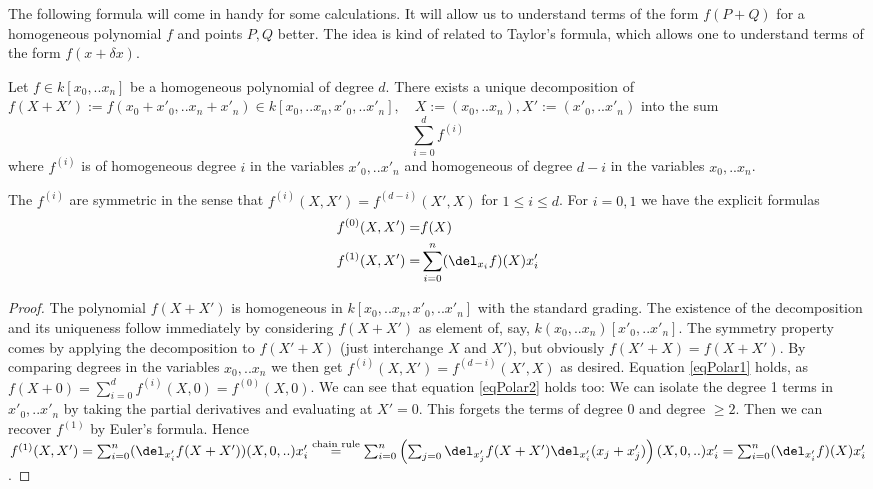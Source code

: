 The following formula will come in handy for some calculations.
It will allow us to understand terms of the form $f(P+Q)$ for a homogeneous polynomial $f$ and points $P,Q$ better.
The idea is kind of related to Taylor's formula, which allows one to understand terms of the form $f(x + \delta x)$.
\begin{proposition} \label{propositionTaylor}
Let $f \in k[x_0,..x_n]$ be a homogeneous polynomial of degree $d$.
There exists a unique decomposition of $f(X+X') := f(x_0+x'_0,..x_n+x'_n) \in k[x_0,..x_n,x'_0,..x'_n], \quad X := (x_0,..x_n), X' := (x'_0,..x'_n)$ into the sum
\begin{equation}
\sum_{i=0}^d f^{(i)}
\end{equation}
where $f^{(i)}$ is of homogeneous degree $i$ in the variables $x'_0,..x'_n$ and homogeneous of degree $d-i$ in the variables $x_0,..x_n$.

The $f^{(i)}$ are symmetric in the sense that $f^{(i)}(X,X') = f^{(d-i)}(X',X)$ for $1 \leq i \leq d$.
For $i = 0,1$ we have the explicit formulas
\begin{align}
f^{(0)}(X,X') =& f(X)  \label{eqPolar1}
\\ f^{(1)}(X,X') =& \sum_{i=0}^n (\del_{x_i}f)(X) x'_i \label{eqPolar2}
\end{align}
\end{proposition}
\begin{proof}
The polynomial $f(X+X')$ is homogeneous in $k[x_0,..x_n,x'_0,..x'_n]$ with the standard grading.
The existence of the decomposition and its uniqueness follow immediately by considering $f(X+X')$ as element of, say, $k(x_0,..x_n)[x'_0,..x'_n]$.
The symmetry property comes by applying the decomposition to $f(X'+X)$ (just interchange $X$ and $X'$), but obviously $f(X'+X) = f(X+X')$.
By comparing degrees in the variables $x_0,..x_n$ we then get $f^{(i)}(X,X') = f^{(d-i)}(X',X)$ as desired.
Equation \ref{eqPolar1} holds, as $f(X+0) = \sum_{i=0}^d f^{(i)}(X,0) = f^{(0)}(X,0)$.
We can see that equation \ref{eqPolar2} holds too:
We can isolate the degree 1 terms in $x'_0,..x'_n$ by taking the partial derivatives and evaluating at $X'=0$.
This forgets the terms of degree 0 and degree $\geq 2$.
Then we can recover $f^{(1)}$ by Euler's formula.
Hence $f^{(1)}(X,X') = \sum_{i=0}^n (\del_{x'_i}f(X+X'))(X,0,..) x'_i
\overset{\text{chain rule}}= \sum_{i=0}^n \left( \sum_{j=0} \del_{x'_j}f(X+X') \del_{x'_i}(x_j + x'_j) \right)(X,0,..)x'_i = \sum_{i=0}^n (\del_{x'_i} f)(X) x'_i$.
\end{proof}

